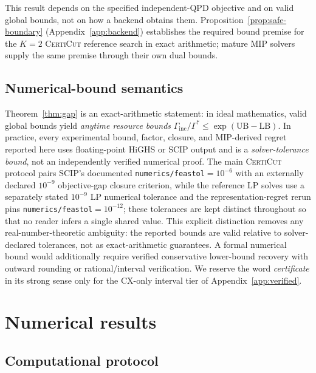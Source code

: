 \documentclass[
  aps,
  pra,
  reprint,
  amsmath,
  amssymb,
  longbibliography,
  nofootinbib,
  floatfix
]{revtex4-2}
\theoremstyle{plain}
\newcommand{\CertiCut}{\textsc{CertiCut}}
\newcommand{\LB}{\mathrm{LB}}
\newcommand{\UB}{\mathrm{UB}}
\begin{document}
This result depends on the specified independent-QPD objective and on valid global bounds, not on how a backend obtains them. Proposition~\ref{prop:safe-boundary} (Appendix~\ref{app:backend}) establishes the required bound premise for the $K=2$ \CertiCut{} reference search in exact arithmetic; mature MIP solvers supply the same premise through their own dual bounds.

\subsection{Numerical-bound semantics}
\label{sec:num-semantics}

Theorem~\ref{thm:gap} is an exact-arithmetic statement: in ideal mathematics, valid global bounds yield \emph{anytime resource bounds} $\Gamma_{\mathrm{inc}}/\Gamma^*\le\exp(\UB-\LB)$. In practice, every experimental bound, factor, closure, and MIP-derived regret reported here uses floating-point HiGHS or SCIP output and is a \emph{solver-tolerance bound}, not an independently verified numerical proof. The main \CertiCut{} protocol pairs SCIP's documented \texttt{numerics/feastol}$=10^{-6}$ with an externally declared $10^{-9}$ objective-gap closure criterion, while the reference LP solves use a separately stated $10^{-9}$ LP numerical tolerance and the representation-regret rerun pins \texttt{numerics/feastol}$=10^{-12}$; these tolerances are kept distinct throughout so that no reader infers a single shared value. This explicit distinction removes any real-number-theoretic ambiguity: the reported bounds are valid relative to solver-declared tolerances, not as exact-arithmetic guarantees. A formal numerical bound would additionally require verified conservative lower-bound recovery with outward rounding or rational/interval verification. We reserve the word \emph{certificate} in its strong sense only for the CX-only interval tier of Appendix~\ref{app:verified}.

\section{Numerical results}
\label{sec:results}

\subsection{Computational protocol}
\label{sec:protocol}
\end{document}
